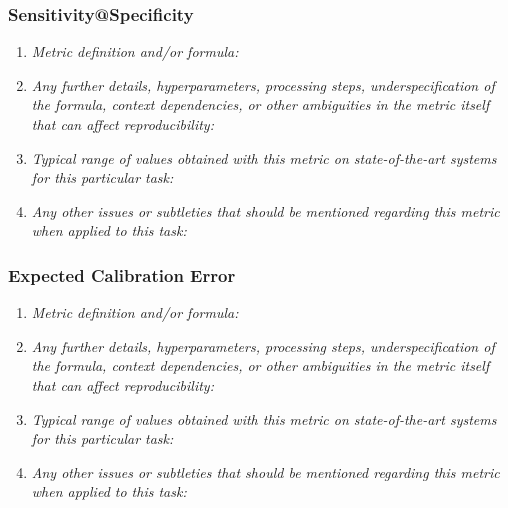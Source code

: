 \documentclass[a4paper,11pt]{article}
\begin{document}
        \subsubsection{Sensitivity@Specificity}
            \begin{enumerate}[label=\alph*.]
                \item \textit{Metric definition and/or formula:}
                \bigskip
                \item \textit{Any further details, hyperparameters, processing steps, underspecification of the formula, context dependencies, or other ambiguities in the metric itself that can affect reproducibility:}
                \bigskip
                \item \textit{Typical range of values obtained with this metric on state-of-the-art systems for this particular task:}
                \bigskip
                \item \textit{Any other issues or subtleties that should be mentioned regarding this metric when applied to this task:}
                \bigskip
            \end{enumerate}
        \subsubsection{Expected Calibration Error}
            \begin{enumerate}[label=\alph*.]
                \item \textit{Metric definition and/or formula:}
                \bigskip
                \item \textit{Any further details, hyperparameters, processing steps, underspecification of the formula, context dependencies, or other ambiguities in the metric itself that can affect reproducibility:}
                \bigskip
                \item \textit{Typical range of values obtained with this metric on state-of-the-art systems for this particular task:}
                \bigskip
                \item \textit{Any other issues or subtleties that should be mentioned regarding this metric when applied to this task:}
                \bigskip
            \end{enumerate}
\end{document}
